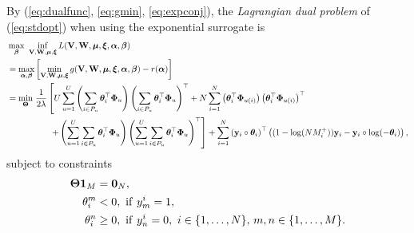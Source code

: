 By (\ref{eq:dualfunc}, \ref{eq:gmin}, \ref{eq:expconj}), the \emph{Lagrangian dual problem} of (\ref{eq:stdopt}) when using the exponential surrogate is
\begin{equation*}
\begin{aligned}
&\max_{{\bm{\beta}}} \ \inf_{\mathbf{V}, \mathbf{W}, \bm{\mu}, \bm{\xi}} L(\mathbf{V}, \mathbf{W}, \bm{\mu}, \bm{\xi}, {\bm{\alpha}}, {\bm{\beta}}) \\
&= \max_{{\bm{\alpha}}, {\bm{\beta}}} \left[ \min_{\mathbf{V}, \mathbf{W}, \bm{\mu}, \bm{\xi}} g(\mathbf{V}, \mathbf{W}, \bm{\mu}, \bm{\xi}, {\bm{\alpha}}, {\bm{\beta}}) - r({\bm{\alpha}}) \right] \\
&= \min_{\mathbf{\Theta}} \, \frac{1}{2 \lambda} \left[
     U \sum_{u=1}^U \left( \sum_{i \in P_u} \bm{\theta}_i^\top \mathbf{\Phi}_u \right) \left( \sum_{i \in P_u} \bm{\theta}_i^\top \mathbf{\Phi}_u \right)^\top
   + N \sum_{i=1}^N \left( \bm{\theta}_i^\top \mathbf{\Phi}_{u(i)} \right) \left( \bm{\theta}_i^\top \mathbf{\Phi}_{u(i)} \right)^\top \right. \\
& \hspace{5em} \left.
   + \left( \sum_{u=1}^U \sum_{i \in P_u} \bm{\theta}_i^\top \mathbf{\Phi}_u \right)
     \left( \sum_{u=1}^U \sum_{i \in P_u} \bm{\theta}_i^\top \mathbf{\Phi}_u \right)^\top \right]
   + \sum_{i=1}^N \left( \mathbf{y}_i \circ \bm{\theta}_i \right)^\top 
     \left( (1 - \log(N M_i^+)) \mathbf{y}_i - \mathbf{y}_i \circ \log(-\bm{\theta}_i) \right),
\end{aligned}
\end{equation*}
subject to constraints
\begin{equation*}
\begin{aligned}
\mathbf{\Theta} \mathbf{1}_M &= \mathbf{0}_N, \\
\theta_i^m & < 0, \ \mathrm{if} \ y_m^i = 1, \\
\theta_i^n & \ge 0, \ \mathrm{if} \ y_n^i = 0, \ i \in \{1,\dots,N\}, \, m,n \in \{1,\dots,M\}.
\end{aligned}
\end{equation*}
